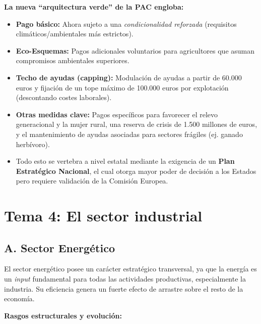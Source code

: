 \textbf{La nueva ``arquitectura verde'' de la PAC engloba:}

\begin{itemize}
  \item \textbf{Pago básico:} Ahora sujeto a una \textit{condicionalidad reforzada} (requisitos climáticos/ambientales más estrictos).
  \item \textbf{Eco-Esquemas:} Pagos adicionales voluntarios para agricultores que asuman compromisos ambientales superiores.
  \item \textbf{Techo de ayudas (capping):} Modulación de ayudas a partir de 60.000 euros y fijación de un tope máximo de 100.000 euros por explotación (descontando costes laborales).
  \item \textbf{Otras medidas clave:} Pagos específicos para favorecer el relevo generacional y la mujer rural, una reserva de crisis de 1.500 millones de euros, y el mantenimiento de ayudas asociadas para sectores frágiles (ej. ganado herbívoro).
  \item Todo esto se vertebra a nivel estatal mediante la exigencia de un \textbf{Plan Estratégico Nacional}, el cual otorga mayor poder de decisión a los Estados pero requiere validación de la Comisión Europea.
\end{itemize}
 
\clearpage
\section*{Tema 4: El sector industrial}

\subsection*{A. Sector Energético}

El sector energético posee un carácter estratégico transversal, ya que la energía es un \textit{input} fundamental para todas las actividades productivas, especialmente la industria. Su eficiencia genera un fuerte efecto de arrastre sobre el resto de la economía.

\textbf{Rasgos estructurales y evolución:}


